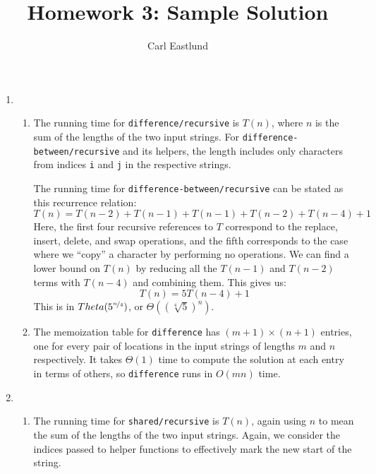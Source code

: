 \documentclass{article}
\title{Homework 3: Sample Solution}
\author{Carl Eastlund}
\date{}
\begin{document}
\maketitle

\newcommand\link[2][http://]{\href{#1#2}{\nolinkurl{#2}}}
\newcommand\http[1]{\link[http://]{#1}}
\newcommand\https[1]{\link[https://]{#1}}
\newcommand\email[1]{\link[mailto:]{#1}}

\bigskip

\newcommand\file\texttt
\newcommand\code\texttt
\newcommand\?{\mbox{\code{?}}}

\begin{enumerate}

\item
  \begin{enumerate}

  \item The running time for \code{difference/recursive} is \(T(n)\), where
    \(n\) is the sum of the lengths of the two input strings.  For
    \code{difference-between/recursive} and its helpers, the length includes
    only characters from indices \code{i} and \code{j} in the respective
    strings.

    The running time for \code{difference-between/recursive} can be stated as
    this recurrence relation:
    \[T(n) = T(n-2) + T(n-1) + T(n-1) + T(n-2) + T(n-4) + 1\]
    Here, the first four recursive references to \(T\) correspond to the
    replace, insert, delete, and swap operations, and the fifth corresponds to
    the case where we ``copy'' a character by performing no operations.  We can
    find a lower bound on \(T(n)\) by reducing all the \(T(n-1)\) and \(T(n-2)\)
    terms with \(T(n-4)\) and combining them.  This gives us:
    \[T(n) = 5T(n-4) + 1\]
    This is in \(Theta(5^{\nicefrac{n}{4}})\), or
    \(\Theta((\sqrt[4]{5})^n)\).

  \item The memoization table for \code{difference} has \((m+1) \times (n+1)\)
    entries, one for every pair of locations in the input strings of lengths
    \(m\) and \(n\) respectively.  It takes \(\Theta(1)\) time to compute the
    solution at each entry in terms of others, so \code{difference} runs in
    \(O(mn)\) time.

  \end{enumerate}

\item
  \begin{enumerate}

  \item The running time for \code{shared/recursive} is \(T(n)\), again using
    \(n\) to mean the sum of the lengths of the two input strings.  Again, we
    consider the indices passed to helper functions to effectively mark the new
    start of the string.


\end{enumerate}
\end{enumerate}
\end{document}
